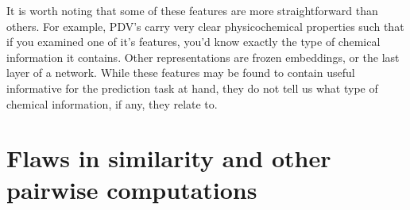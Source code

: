 It is worth noting that some of these features are more straightforward than others. For example, PDV's carry very clear physicochemical properties such that if you examined one of it's features, you'd know exactly the type of chemical information it contains. Other representations are frozen embeddings, or the last layer of a network. While these features may be found to contain useful informative for the prediction task at hand, they do not tell us what type of chemical information, if any, they relate to.


\section{Flaws in similarity and other pairwise computations}
%
